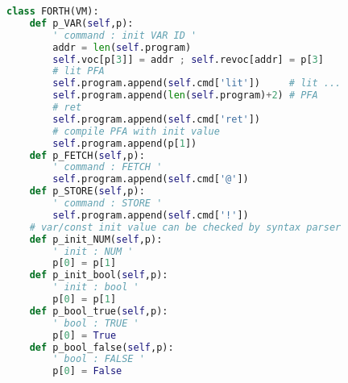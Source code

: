 \begin{lstlisting}[language=Python]
class FORTH(VM):
 	def p_VAR(self,p):
 		' command : init VAR ID '
 		addr = len(self.program)
 		self.voc[p[3]] = addr ; self.revoc[addr] = p[3]
 		# lit PFA
 		self.program.append(self.cmd['lit'])	 # lit ...
 		self.program.append(len(self.program)+2) # PFA
 		# ret
 		self.program.append(self.cmd['ret'])
 		# compile PFA with init value
 		self.program.append(p[1])
 	def p_FETCH(self,p):
 		' command : FETCH '
 		self.program.append(self.cmd['@'])
 	def p_STORE(self,p):
 		' command : STORE '
 		self.program.append(self.cmd['!'])
 	# var/const init value can be checked by syntax parser
 	def p_init_NUM(self,p):
 		' init : NUM '
 		p[0] = p[1]
 	def p_init_bool(self,p):
 		' init : bool '
 		p[0] = p[1]
 	def p_bool_true(self,p):
 		' bool : TRUE '
 		p[0] = True
 	def p_bool_false(self,p):
 		' bool : FALSE '
 		p[0] = False
\end{lstlisting}

